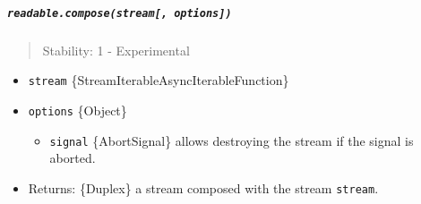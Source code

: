 \subparagraph{\texorpdfstring{\texttt{readable.compose(stream{[},\ options{]})}}{readable.compose(stream{[}, options{]})}}\label{readable.composestream-options}

\begin{quote}
Stability: 1 - Experimental
\end{quote}

\begin{itemize}
\tightlist
\item
  \texttt{stream}
  \{Stream\textbar Iterable\textbar AsyncIterable\textbar Function\}
\item
  \texttt{options} \{Object\}

  \begin{itemize}
  \tightlist
  \item
    \texttt{signal} \{AbortSignal\} allows destroying the stream if the
    signal is aborted.
  \end{itemize}
\item
  Returns: \{Duplex\} a stream composed with the stream \texttt{stream}.
\end{itemize}

\begin{Shaded}
\begin{Highlighting}[]
 \OperatorTok{;}

 \OperatorTok{*} 
   \NormalTok{ (}
    \OperatorTok{=} \NormalTok{(}\StringTok{\textquotesingle{} \textquotesingle{}}\NormalTok{)}\OperatorTok{;}

    \NormalTok{ (}
      \OperatorTok{;}
\NormalTok{    \}}
\NormalTok{  \}}
\NormalTok{\}}

\OperatorTok{=}\NormalTok{([}\OperatorTok{,} \NormalTok{])}\OperatorTok{;}
\OperatorTok{=} \NormalTok{()}\OperatorTok{;}

\OperatorTok{;} 
\end{Highlighting}
\end{Shaded}

